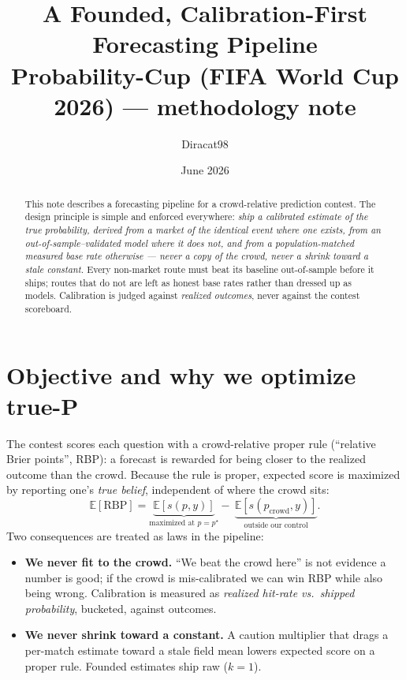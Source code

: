 \documentclass[11pt]{article}
\title{\textbf{A Founded, Calibration-First Forecasting Pipeline}\\[2pt]
\large Probability-Cup (FIFA World Cup 2026) --- methodology note}
\author{Diracat98}
\date{June 2026}
\begin{document}
\maketitle

\begin{abstract}
\noindent This note describes a forecasting pipeline for a crowd-relative prediction contest.
The design principle is simple and enforced everywhere: \emph{ship a calibrated estimate of the
true probability, derived from a market of the identical event where one exists, from an
out-of-sample--validated model where it does not, and from a population-matched measured base
rate otherwise --- never a copy of the crowd, never a shrink toward a stale constant.} Every
non-market route must beat its baseline out-of-sample before it ships; routes that do not are
left as honest base rates rather than dressed up as models. Calibration is judged against
\emph{realized outcomes}, never against the contest scoreboard.
\end{abstract}

\section{Objective and why we optimize true-P}
The contest scores each question with a crowd-relative proper rule (``relative Brier points'',
RBP): a forecast is rewarded for being closer to the realized outcome than the crowd. Because
the rule is proper, expected score is maximized by reporting one's \emph{true belief}, independent
of where the crowd sits:
\[
\mathbb{E}[\mathrm{RBP}] = \underbrace{\mathbb{E}[s(p,y)]}_{\text{maximized at } p=p^\star}
-\ \underbrace{\mathbb{E}[s(p_{\text{crowd}},y)]}_{\text{outside our control}} .
\]
Two consequences are treated as laws in the pipeline:
\begin{itemize}
\item \textbf{We never fit to the crowd.} ``We beat the crowd here'' is not evidence a number is
good; if the crowd is mis-calibrated we can win RBP while also being wrong. Calibration is
measured as \emph{realized hit-rate vs.\ shipped probability}, bucketed, against outcomes.
\item \textbf{We never shrink toward a constant.} A caution multiplier that drags a per-match
estimate toward a stale field mean lowers expected score on a proper rule. Founded estimates
ship raw ($k=1$).
\end{itemize}
\end{document}

